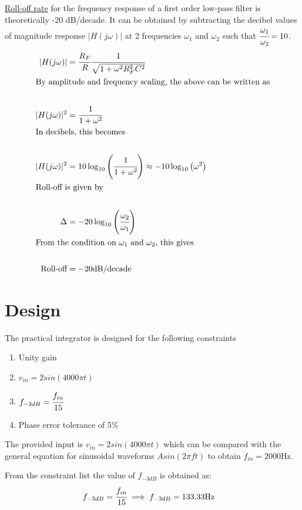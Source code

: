 \documentclass[12pt, titlepage]{article}
\theoremstyle{definition}
\begin{document}
    \underline{Roll-off rate} for the frequency response of a first order low-pass filter is theoretically -20 dB/decade.
    It can be obtained by subtracting the decibel values of magnitude response $|H(j\omega)|$ at 2 frequencies $\omega_1$ and $\omega_2$ such that $\cfrac{\omega_1}{\omega_2} = 10$.
    \begin{align*}
      |H(j\omega)| &= \cfrac{R_{F}}{R} \cfrac{1}{\sqrt{1+\omega^2 R_F^2 C^2}}\\
      \intertext{By amplitude and frequency scaling, the above can be written as}\\
      |H(j\omega)|^2 &= \cfrac{1}{1 + \omega^2}\\
      \intertext{In decibels, this becomes}\\
      |H(j\omega)|^2 &= 10\log_{10}\left(\cfrac{1}{1 + \omega^2}\right) \approx -10\log_{10}\left(\omega^2 \right)\\
      \intertext{Roll-off is given by }\\
      \Delta &= -20\log_{10}\left(\cfrac{\omega_2}{\omega_1}\right) \\
      \intertext{From the condition on $\omega_1$ and $\omega_2$, this gives}\\
      \text{Roll-off} &= -20 \text{dB/decade}
    \end{align*}

  \newpage
  \section{Design}
    The practical integrator is designed for the following constraints
    \begin{enumerate}[topsep=1pt, label=(\alph*)]
      \item Unity gain
      \item $v_{in} = 2sin(4000\pi t)$
      \item $f_{-3dB} = \cfrac{f_{in}}{15}$
      \item Phase error tolerance of 5\%
    \end{enumerate}

    The provided input is $v_{in} = 2 sin(4000\pi t)$ which can be compared with the general equation for sinusoidal waveforms $A sin(2\pi ft)$ to obtain \underline{$f_{in} = 2000\text{Hz}$}.

    From the constraint list the value of \underline{$f_{-3dB}$} is obtained as:
    \begin{align*}
      f_{-3dB} &= \cfrac{f_{in}}{15}
      \implies f_{-3dB} = 133.33\text{Hz}
    \end{align*}
\end{document}
